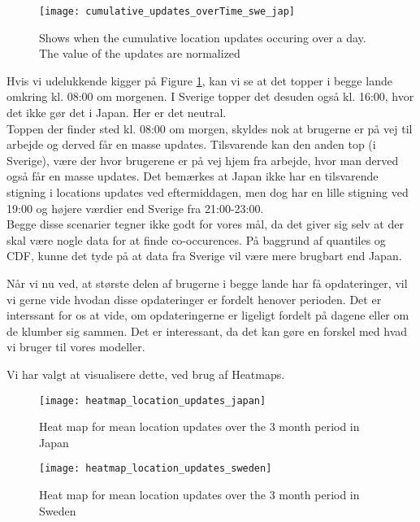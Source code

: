 \begin{figure}[H]
    \hspace*{-1.8cm}
    \centering
    \texttt{[image: cumulative\_updates\_overTime\_swe\_jap]}
    \caption{Shows when the cumulative location updates occuring over a day. The value of the updates are normalized}
    \label{fig:cumu_loc_time_jap_swe}
\end{figure}

Hvis vi udelukkende kigger på Figure \ref{fig:cumu_loc_time_jap_swe}, kan vi se at det topper i begge lande omkring kl. 08:00 om morgenen. I Sverige topper det desuden også kl. 16:00, hvor det ikke gør det i Japan. Her er det neutral. \\
Toppen der finder sted kl. 08:00 om morgen, skyldes nok at brugerne er på vej til arbejde og derved får en masse updates. Tilsvarende kan den anden top (i Sverige), være der hvor brugerene er på vej hjem fra arbejde, hvor man derved også får en masse updates. Det bemærkes at Japan ikke har en tilsvarende stigning i locations updates ved eftermiddagen, men dog har en lille stigning ved 19:00 og højere værdier end Sverige fra 21:00-23:00.\\

Begge disse scenarier tegner ikke godt for vores mål, da det giver sig selv at der skal være nogle data for at finde co-occurences. 
På baggrund af quantiles og CDF, kunne det tyde på at data fra Sverige vil være mere brugbart end Japan. 

Når vi nu ved, at største delen af brugerne i begge lande har få opdateringer, vil vi gerne vide hvodan disse opdateringer er fordelt henover perioden. Det er interssant for os at vide, om opdateringerne er ligeligt fordelt på dagene eller om de klumber sig sammen. Det er interessant, da det kan gøre en forskel med hvad vi bruger til vores modeller. 

Vi har valgt at visualisere dette, ved brug af Heatmaps. 

\newpage


\begin{figure}[H]
    \hspace*{-1.5cm}
    \centering
    \texttt{[image: heatmap\_location\_updates\_japan]}
    \caption{Heat map for mean location updates over the 3 month period in Japan}
    \label{fig:heatmap_jap}
\end{figure}
\begin{figure}[H]
    \hspace*{-1.5cm}
    \centering
    \texttt{[image: heatmap\_location\_updates\_sweden]}
    \caption{Heat map for mean location updates over the 3 month period in Sweden}
    \label{fig:heatmap_swe}
\end{figure}


